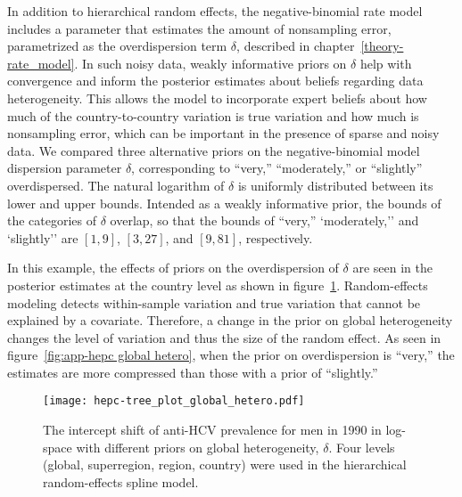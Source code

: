 In addition to hierarchical random effects, the negative-binomial
rate model includes a parameter that estimates
the amount of nonsampling error, parametrized as the overdispersion
term $\delta$, described in chapter~\ref{theory-rate_model}.
In such noisy data, weakly informative priors on $\delta$ help with
convergence and inform the posterior estimates about beliefs
regarding data heterogeneity.  This allows the model to incorporate
expert beliefs about how much of the country-to-country variation is
true variation and how much is nonsampling error, which can be
important in the presence of sparse and noisy data.  We compared three
alternative priors on the negative-binomial model dispersion
parameter $\delta$, corresponding to ``very,'' ``moderately,'' or
``slightly'' overdispersed.  The natural logarithm of $\delta$ is
uniformly distributed between its lower and upper bounds.  Intended as
a weakly informative prior, the bounds of the categories of $\delta$ overlap, so
that the bounds of ``very,'' `moderately,'' and `slightly'' are $[1,9]$, $[3,27]$, and
$[9,81]$, respectively.

In this example, the effects of priors on the overdispersion of
$\delta$ are seen in the posterior estimates at the country level as
shown in figure~\ref{fig:app-hepc global hetero}.  Random-effects
modeling detects within-sample variation and true variation that
cannot be explained by a covariate.  Therefore, a change in the prior
on global heterogeneity changes the level of variation and thus the
size of the random effect.  As seen in figure~\ref{fig:app-hepc global
  hetero}, when the prior on overdispersion is ``very,'' the estimates
are more compressed than those with a prior of ``slightly.''

    \begin{figure}[h]
        \begin{center}
            \texttt{[image: hepc-tree\_plot\_global\_hetero.pdf]}
            \caption[The intercept shift of anti-HCV
              prevalence with different priors on global heterogeneity.]{The intercept shift of anti-HCV
              prevalence for men in 1990 in log-space with different priors on
              global heterogeneity, $\delta$.  Four levels (global,
              superregion, region, country) were used in the
              hierarchical random-effects spline model.}
            \label{fig:app-hepc global hetero}
        \end{center}
    \end{figure}

